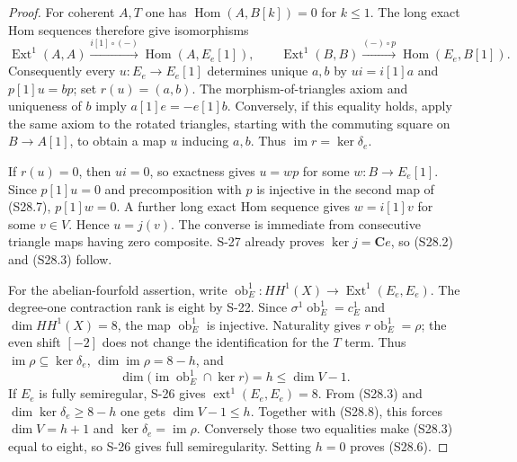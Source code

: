 \documentclass[11pt,a4paper]{article}
\theoremstyle{definition}
\begin{document}
\begin{proof}
For coherent $A,T$ one has
$\operatorname{Hom}(A,B[k])=0$ for $k\le1$.
The long exact Hom sequences therefore give isomorphisms
\[
 \operatorname{Ext}^1(A,A)
     \xrightarrow{i[1]\circ(-)}\operatorname{Hom}(A,E_e[1]),
 \qquad
 \operatorname{Ext}^1(B,B)
     \xrightarrow{(-)\circ p}\operatorname{Hom}(E_e,B[1]).
 \tag{S28.7}
\]
Consequently every $u:E_e\to E_e[1]$ determines unique
$a,b$ by $ui=i[1]a$ and $p[1]u=bp$; set $r(u)=(a,b)$.
The morphism-of-triangles axiom and uniqueness of $b$
imply $a[1]e=-e[1]b$. Conversely, if this equality holds,
apply the same axiom to the rotated triangles, starting
with the commuting square on $B\to A[1]$, to obtain a
map $u$ inducing $a,b$. Thus $\operatorname{im}r=\ker\delta_e$.

If $r(u)=0$, then $ui=0$, so exactness gives $u=wp$ for
some $w:B\to E_e[1]$. Since $p[1]u=0$ and precomposition
with $p$ is injective in the second map of (S28.7),
$p[1]w=0$. A further long exact Hom sequence gives
$w=i[1]v$ for some $v\in V$. Hence $u=j(v)$.
The converse is immediate from consecutive triangle maps
having zero composite. S-27 already proves
$\ker j=\mathbf C e$, so (S28.2) and (S28.3) follow.

For the abelian-fourfold assertion, write
$\operatorname{ob}^1_E:HH^1(X)\to\operatorname{Ext}^1(E_e,E_e)$.
The degree-one contraction rank is eight by S-22.
Since $\sigma^1\operatorname{ob}^1_E=c_E^1$ and
$\dim HH^1(X)=8$, the map $\operatorname{ob}^1_E$ is
injective. Naturality gives
$r\operatorname{ob}^1_E=\rho$; the even shift $[-2]$
does not change the identification for the $T$ term.
Thus $\operatorname{im}\rho\subseteq\ker\delta_e$,
$\dim\operatorname{im}\rho=8-h$, and
\[
 \dim\bigl(\operatorname{im}\operatorname{ob}^1_E
                 \cap\ker r\bigr)=h\le\dim V-1.
 \tag{S28.8}
\]
If $E_e$ is fully semiregular, S-26 gives
$\operatorname{ext}^1(E_e,E_e)=8$. From (S28.3) and
$\dim\ker\delta_e\ge8-h$ one gets $\dim V-1\le h$.
Together with (S28.8), this forces $\dim V=h+1$ and
$\ker\delta_e=\operatorname{im}\rho$.
Conversely those two equalities make (S28.3) equal to
eight, so S-26 gives full semiregularity. Setting $h=0$
proves (S28.6).
\end{proof}
\end{document}
